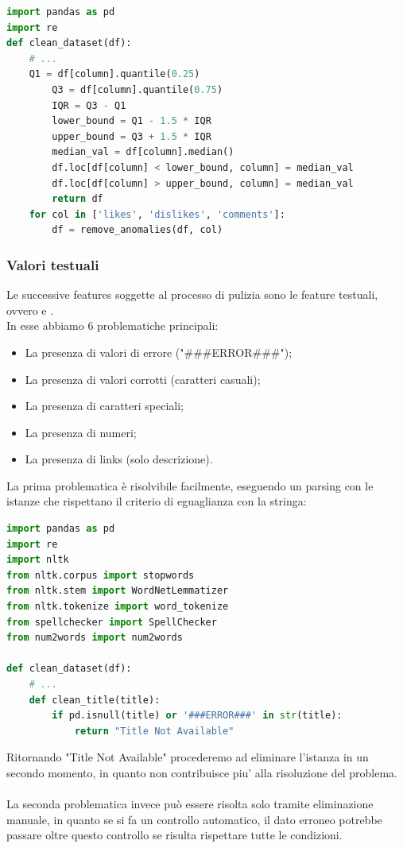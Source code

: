 \documentclass[a4paper,12pt]{report}
\begin{document}
\newpage
\begin{lstlisting}[language=Python]
import pandas as pd
import re
def clean_dataset(df):
    # ...
    Q1 = df[column].quantile(0.25)
        Q3 = df[column].quantile(0.75)
        IQR = Q3 - Q1
        lower_bound = Q1 - 1.5 * IQR
        upper_bound = Q3 + 1.5 * IQR
        median_val = df[column].median()
        df.loc[df[column] < lower_bound, column] = median_val
        df.loc[df[column] > upper_bound, column] = median_val
        return df
    for col in ['likes', 'dislikes', 'comments']:
        df = remove_anomalies(df, col)
\end{lstlisting}
\subsubsection{Valori testuali}
Le successive features soggette al processo di pulizia sono le feature testuali, ovvero \texttt{\color{red}{title}} e \texttt{\color{red}{description}}.\\
In esse abbiamo 6 problematiche principali:
\begin{itemize}
        \item La presenza di valori di errore ("\#\#\#ERROR\#\#\#");
        \item La presenza di valori corrotti (caratteri casuali);
        \item La presenza di caratteri speciali;
        \item La presenza di numeri;
        \item La presenza di links (solo descrizione).
\end{itemize}
\newpage
La prima problematica è risolvibile facilmente, eseguendo un parsing con le istanze che rispettano il criterio di eguaglianza con la stringa:
\begin{lstlisting}[language=Python]
import pandas as pd
import re
import nltk
from nltk.corpus import stopwords
from nltk.stem import WordNetLemmatizer
from nltk.tokenize import word_tokenize
from spellchecker import SpellChecker
from num2words import num2words

def clean_dataset(df):
    # ...
    def clean_title(title):
        if pd.isnull(title) or '###ERROR###' in str(title):
            return "Title Not Available"
\end{lstlisting}
Ritornando "Title Not Available" procederemo ad eliminare l'istanza in un secondo momento, in quanto non contribuisce piu' alla risoluzione del problema.\\
\\
La seconda problematica invece può essere risolta solo tramite eliminazione manuale, in quanto se si fa un controllo automatico, il dato erroneo potrebbe passare oltre questo controllo se risulta rispettare tutte le condizioni.
\end{document}
